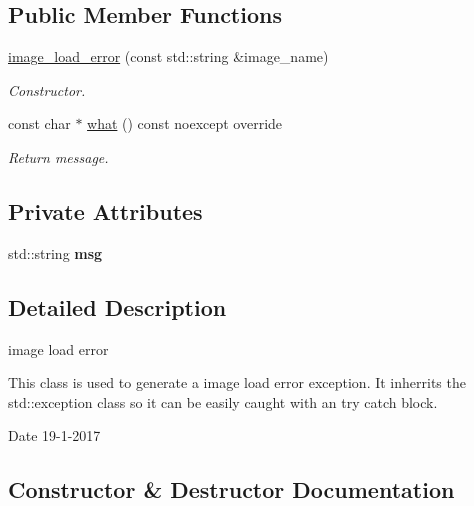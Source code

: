 \subsection*{Public Member Functions}
\begin{DoxyCompactItemize}
\item 
\hyperlink{classimage__load__error_a39665f8755ddd18f61bd837300805cd1}{image\+\_\+load\+\_\+error} (const std\+::string \&image\+\_\+name)
\begin{DoxyCompactList}\small\item\em Constructor. \end{DoxyCompactList}\item 
const char $\ast$ \hyperlink{classimage__load__error_ab73fa8f110ff313005a7bb0ed66fd880}{what} () const noexcept override
\begin{DoxyCompactList}\small\item\em Return message. \end{DoxyCompactList}\end{DoxyCompactItemize}
\subsection*{Private Attributes}
\begin{DoxyCompactItemize}
\item 
\mbox{\label{classimage__load__error_a250134697d7e52db38453039ad59c7df}} 
std\+::string {\bfseries msg}
\end{DoxyCompactItemize}


\subsection{Detailed Description}
image load error 

This class is used to generate a image load error exception. It inherrits the std\+::exception class so it can be easily caught with an try catch block.

\begin{DoxyDate}{Date}
19-\/1-\/2017 
\end{DoxyDate}


\subsection{Constructor \& Destructor Documentation}
\mbox{\label{classimage__load__error_a39665f8755ddd18f61bd837300805cd1}} 
